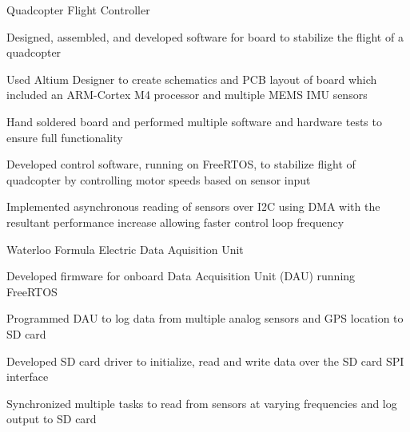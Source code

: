 

\begin{cventries}

  \cventry
    {Quadcopter Flight Controller} %
    {} %
    {} %
    {} %
    {
      \begin{cvitems} %
        \item {Designed, assembled, and developed software for board to stabilize the flight of a quadcopter}
        \item {Used Altium Designer to create schematics and PCB layout of board which included an ARM-Cortex M4 processor and multiple MEMS IMU sensors}
        \item {Hand soldered board and performed multiple software and hardware tests to ensure full functionality}
        \item {Developed control software, running on FreeRTOS, to stabilize flight of quadcopter by controlling motor speeds based on sensor input}
        \item {Implemented asynchronous reading of sensors over I2C using DMA with the resultant performance increase allowing faster control loop frequency}
      \end{cvitems}
    }

  \cventry
    {Waterloo Formula Electric} %
    {Data Aquisition Unit} %
    {} %
    {} %
    {
      \begin{cvitems} %
        \item {Developed firmware for onboard Data Acquisition Unit (DAU) running FreeRTOS}
        \item {Programmed DAU to log data from multiple analog sensors and GPS location to SD card}
        \item {Developed SD card driver to initialize, read and write data over the SD card SPI interface}
        \item {Synchronized multiple tasks to read from sensors at varying frequencies and log output to SD card}
      \end{cvitems}
    }


\end{cventries}

